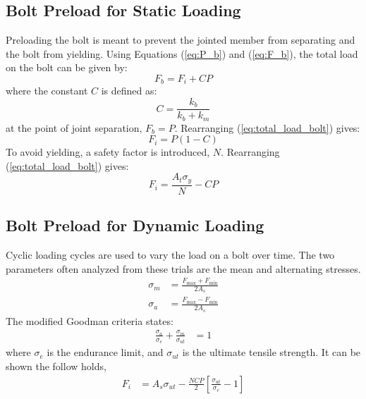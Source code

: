 \subsection{Bolt Preload for Static Loading}
Preloading the bolt is meant to prevent the jointed member from separating and the bolt from yielding. Using Equations (\ref{eq:P_b}) and (\ref{eq:F_b}), the total load on the bolt can be given by:
\begin{equation}
    F_b = F_i + CP \label{eq:total_load_bolt}
\end{equation}
where the constant $C$ is defined as:
\begin{equation}
    C = \frac{k_b}{k_b+k_m} \label{eq:constant_C}
\end{equation}
at the point of joint separation, $F_b = P$. Rearranging (\ref{eq:total_load_bolt}) gives:
\begin{equation}
    F_i = P(1-C) \label{eq:joint_separation}
\end{equation}
To avoid yielding, a safety factor is introduced, $N$. Rearranging (\ref{eq:total_load_bolt}) gives:
\begin{equation}
    F_i = \frac{A_t \sigma_{y}}{N} - CP \label{eq:yielding}
\end{equation}

\subsection{Bolt Preload for Dynamic Loading}
Cyclic loading cycles are used to vary the load on a bolt over time. The two parameters often analyzed from these trials are the mean and alternating stresses.
\begin{align}
    \sigma_m &= \frac{F_{\text{max}} + F_{\text{min}}}{2A_s} \label{eq:mean_stress} \\
    \sigma_a &= \frac{F_{\text{max}} - F_{\text{min}}}{2A_s} \label{eq:alternating_stress}
\end{align}
The modified Goodman criteria states:
\begin{align*}
    \frac{\sigma_a}{\sigma_e} + \frac{\sigma_m}{\sigma_{ut}} &= 1
\end{align*}
where $\sigma_e$ is the endurance limit, and $\sigma_{ut}$ is the ultimate tensile strength. It can be shown the follow holds,
\begin{align*}
    F_i &= A_s \sigma_{ut} - \frac{NCP}{2} \left[\frac{\sigma_{ut}}{\sigma_e} - 1\right]
\end{align*}